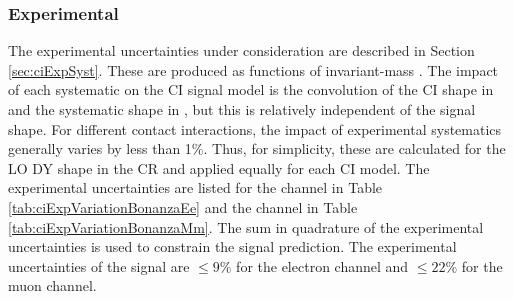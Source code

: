 \subsubsection{Experimental}\label{sec:ciSigExpSyst}

The experimental uncertainties under consideration are described in Section \ref{sec:ciExpSyst}.
These are produced as functions of invariant-mass \mll.
The impact of each systematic on the CI signal model is the convolution of the CI shape in \mll and the systematic shape in \mll, but this is relatively independent of the signal shape.
For different contact interactions, the impact of experimental systematics generally varies by less than 1\%.
Thus, for simplicity, these are calculated for the LO DY shape in the CR and applied equally for each CI model.
The experimental uncertainties are listed for the \ee channel in Table \ref{tab:ciExpVariationBonanzaEe} and the \mm channel in Table \ref{tab:ciExpVariationBonanzaMm}.
The sum in quadrature of the experimental uncertainties is used to constrain the signal prediction.
The experimental uncertainties of the signal are $\leq 9\%$ for the electron channel and $\leq 22\%$ for the muon channel.



